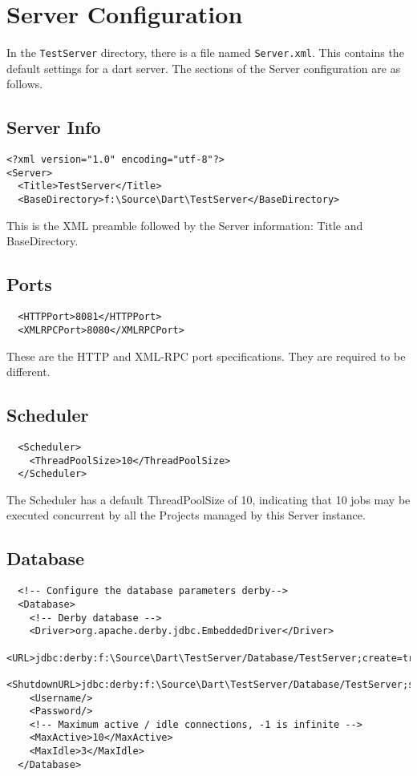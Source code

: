 \documentclass{InsightBook}
\newcommand{\filename}[1]{\texttt{#1}}
\begin{document}
\section{Server Configuration}
\label{Section:Settings}
In the \texttt{TestServer} directory, there is a file named
\filename{Server.xml}.  This contains the default settings for a dart
server.  The sections of the Server configuration are as follows.

\subsection{Server Info}
\begin{verbatim}
<?xml version="1.0" encoding="utf-8"?>
<Server>
  <Title>TestServer</Title>
  <BaseDirectory>f:\Source\Dart\TestServer</BaseDirectory>
\end{verbatim}

This is the XML preamble followed by the Server information: Title and
BaseDirectory.

\subsection{Ports}
\begin{verbatim}
  <HTTPPort>8081</HTTPPort>
  <XMLRPCPort>8080</XMLRPCPort>
\end{verbatim}
These are the HTTP and XML-RPC port specifications.  They are required
to be different.

\subsection{Scheduler}
\begin{verbatim}
  <Scheduler>
    <ThreadPoolSize>10</ThreadPoolSize>
  </Scheduler>
\end{verbatim}

The Scheduler has a default ThreadPoolSize of 10, indicating that 10
 jobs may be executed concurrent by all the Projects managed by this
 Server instance.

\subsection{Database}
\begin{verbatim}
  <!-- Configure the database parameters derby-->
  <Database>
    <!-- Derby database -->
    <Driver>org.apache.derby.jdbc.EmbeddedDriver</Driver>
    <URL>jdbc:derby:f:\Source\Dart\TestServer/Database/TestServer;create=true</URL>
    <ShutdownURL>jdbc:derby:f:\Source\Dart\TestServer/Database/TestServer;shutdown=true</ShutdownURL>
    <Username/>
    <Password/>
    <!-- Maximum active / idle connections, -1 is infinite -->
    <MaxActive>10</MaxActive>
    <MaxIdle>3</MaxIdle>
  </Database>
\end{verbatim}
\end{document}

